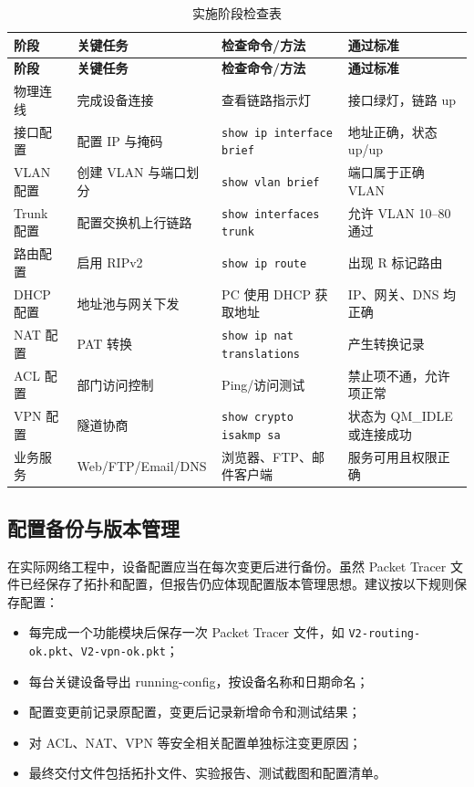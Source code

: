 \documentclass[12pt,a4paper]{ctexart}
\begin{document}
\begin{longtable}{|p{2.5cm}|p{4cm}|p{4cm}|p{3.5cm}|}
\caption{实施阶段检查表}
\label{tab:deploy-checklist}\\
\hline
\textbf{阶段} & \textbf{关键任务} & \textbf{检查命令/方法} & \textbf{通过标准} \\ \hline
\endfirsthead
\hline
\textbf{阶段} & \textbf{关键任务} & \textbf{检查命令/方法} & \textbf{通过标准} \\ \hline
\endhead
物理连线 & 完成设备连接 & 查看链路指示灯 & 接口绿灯，链路 up \\ \hline
接口配置 & 配置 IP 与掩码 & \texttt{show ip interface brief} & 地址正确，状态 up/up \\ \hline
VLAN 配置 & 创建 VLAN 与端口划分 & \texttt{show vlan brief} & 端口属于正确 VLAN \\ \hline
Trunk 配置 & 配置交换机上行链路 & \texttt{show interfaces trunk} & 允许 VLAN 10--80 通过 \\ \hline
路由配置 & 启用 RIPv2 & \texttt{show ip route} & 出现 R 标记路由 \\ \hline
DHCP 配置 & 地址池与网关下发 & PC 使用 DHCP 获取地址 & IP、网关、DNS 均正确 \\ \hline
NAT 配置 & PAT 转换 & \texttt{show ip nat translations} & 产生转换记录 \\ \hline
ACL 配置 & 部门访问控制 & Ping/访问测试 & 禁止项不通，允许项正常 \\ \hline
VPN 配置 & 隧道协商 & \texttt{show crypto isakmp sa} & 状态为 QM\_IDLE 或连接成功 \\ \hline
业务服务 & Web/FTP/Email/DNS & 浏览器、FTP、邮件客户端 & 服务可用且权限正确 \\ \hline
\end{longtable}

\subsection{配置备份与版本管理}

在实际网络工程中，设备配置应当在每次变更后进行备份。虽然 Packet Tracer 文件已经保存了拓扑和配置，但报告仍应体现配置版本管理思想。建议按以下规则保存配置：

\begin{itemize}
    \item 每完成一个功能模块后保存一次 Packet Tracer 文件，如 \texttt{V2-routing-ok.pkt}、\texttt{V2-vpn-ok.pkt}；
    \item 每台关键设备导出 running-config，按设备名称和日期命名；
    \item 配置变更前记录原配置，变更后记录新增命令和测试结果；
    \item 对 ACL、NAT、VPN 等安全相关配置单独标注变更原因；
    \item 最终交付文件包括拓扑文件、实验报告、测试截图和配置清单。
\end{itemize}
\end{document}
